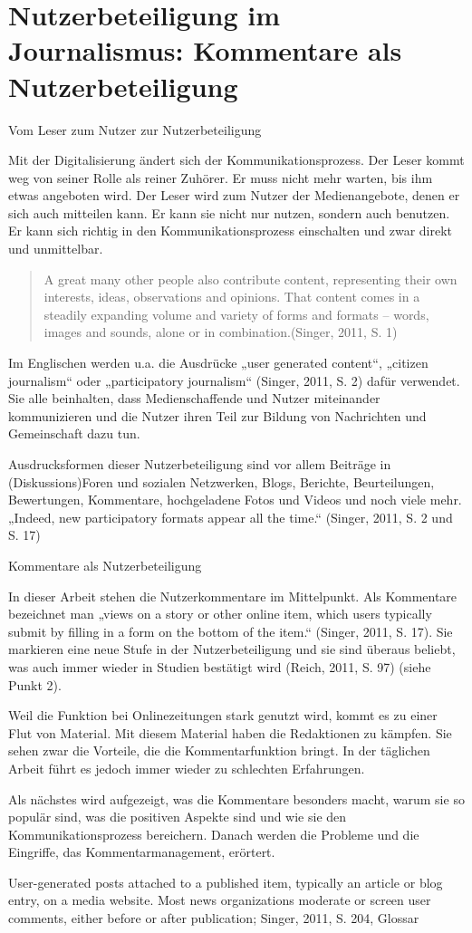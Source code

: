 \chapter{Nutzerbeteiligung im Journalismus: Kommentare als Nutzerbeteiligung}

Vom Leser zum Nutzer zur Nutzerbeteiligung

Mit der Digitalisierung ändert sich der Kommunikationsprozess. Der Leser kommt
weg von seiner Rolle als reiner Zuhörer. Er muss nicht mehr warten, bis ihm
etwas angeboten wird. Der Leser wird zum Nutzer der Medienangebote, denen er
sich auch mitteilen kann. Er kann sie nicht nur nutzen, sondern auch benutzen.
Er kann sich richtig in den Kommunikationsprozess einschalten und zwar direkt
und unmittelbar.

\begin{quote}
\glqq A great many other people also contribute content, representing their own
interests, ideas, observations and opinions. That content comes in a steadily
expanding volume and variety of forms and formats – words, images and sounds,
alone or in combination.\glqq (Singer, 2011, S. 1)
\end{quote}

Im Englischen werden u.a. die Ausdrücke „user generated content“, „citizen
journalism“ oder „participatory journalism“ (Singer, 2011, S. 2) dafür
verwendet. Sie alle beinhalten, dass Medienschaffende und Nutzer miteinander
kommunizieren und die Nutzer ihren Teil zur Bildung von Nachrichten und
Gemeinschaft dazu tun.

Ausdrucksformen dieser Nutzerbeteiligung sind vor allem Beiträge in
(Diskussions\-)Foren und sozialen Netzwerken, Blogs, Berichte, Beurteilungen,
Bewertungen, Kommentare, hochgeladene Fotos und Videos und noch viele mehr.
„Indeed, new participatory formats appear all the time.“ (Singer, 2011, S. 2 und
S. 17)


Kommentare als Nutzerbeteiligung

In dieser Arbeit stehen die Nutzerkommentare im Mittelpunkt. Als Kommentare
bezeichnet man „views on a story or other online item, which users typically
submit by filling in a form on the bottom of the item.“ (Singer, 2011, S. 17).
Sie markieren eine neue Stufe in der Nutzerbeteiligung und sie sind überaus
beliebt, was auch immer wieder in Studien bestätigt wird (Reich, 2011, S. 97)
(siehe Punkt 2).

Weil die Funktion bei Onlinezeitungen stark genutzt wird, kommt es zu einer Flut
von Material. Mit diesem Material haben die Redaktionen zu kämpfen. Sie sehen
zwar die Vorteile, die die Kommentarfunktion bringt. In der täglichen Arbeit
führt es jedoch immer wieder zu schlechten Erfahrungen.

Als nächstes wird aufgezeigt, was die Kommentare besonders macht, warum sie so
populär sind, was die positiven Aspekte sind und wie sie den
Kommunikationsprozess bereichern. Danach werden die Probleme und die Eingriffe, 
das Kommentarmanagement, erörtert.

User-generated posts attached to a published item, typically an article or blog
entry, on a media website. Most news organizations moderate or screen user
comments, either before or after publication; Singer, 2011, S. 204, Glossar